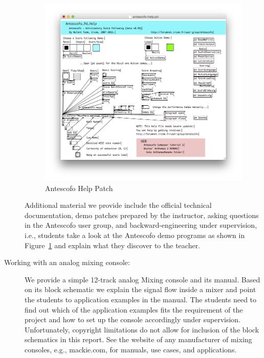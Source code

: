 \documentclass[onecolumn,nocopyrightspace,preprint]{sigplanconf}
\begin{document}
\begin{description}
\begin{figure}[ht]
    \centering
    \includegraphics[scale=0.5]{fig/ascohelp.png}
    \caption{Antescofo Help Patch}
    \label{fig:ascohelp}
\end{figure}

Additional material we provide include the official technical documentation,
demo patches prepared by the instructor, asking questions in the Antescofo
user group, and backward-engineering under supervision, i.e., students take a
look at the Antescofo demo programs as shown in Figure~\ref{fig:ascohelp} and
explain what they discover to the teacher.


\item[Working with an analog mixing console:] We provide a simple 12-track
analog Mixing console and its manual. Based on its block schematic we
explain the signal flow inside a mixer and point the students to application
examples in the manual. The students need to find out which of the application
examples fits the requirement of the project and how to set up the console
accordingly under supervision. Unfortunately, copyright limitations do not
allow for inclusion of the block schematics in this report. See the website of
any manufacturer of mixing consoles, e.g., mackie.com, for manuals, use cases,
and applications.


\end{description}
\end{document}
